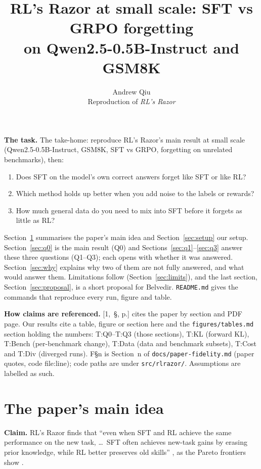 \documentclass[11pt]{article}
\title{RL's Razor at small scale: SFT vs GRPO forgetting\\on Qwen2.5-0.5B-Instruct and GSM8K}
\author{Andrew Qiu\\[4pt]\normalsize Reproduction of \emph{RL's Razor} \cite{razor}}
\date{}
\newcommand{\T}[1]{\textsf{T:#1}}
\newcommand{\F}[1]{\textsf{F\S#1}}
\begin{document}
\maketitle
\thispagestyle{empty}

\noindent\textbf{The task.} The take-home: reproduce RL's Razor's main result at small scale (Qwen2.5-0.5B-Instruct,
GSM8K, SFT vs GRPO, forgetting on unrelated benchmarks), then:
\begin{enumerate}[leftmargin=1.6em,itemsep=0pt]
\item Does SFT on the model's own correct answers forget like SFT or like RL?
\item Which method holds up better when you add noise to the labels or rewards?
\item How much general data do you need to mix into SFT before it forgets as little as RL?
\end{enumerate}
\noindent Section~\ref{sec:idea} summarises the paper's main idea and Section~\ref{sec:setup} our setup.
Section~\ref{sec:q0} is the main result (Q0) and Sections~\ref{sec:q1}--\ref{sec:q3} answer these three questions
(Q1--Q3); each opens with whether it was answered. Section~\ref{sec:why} explains why two of them are not fully
answered, and what would answer them. Limitations follow (Section~\ref{sec:limits}), and the last section,
Section~\ref{sec:proposal}, is a short proposal for Belvedir.
\texttt{README.md} gives the commands that reproduce every run, figure and table.

\medskip
{\small\noindent\textbf{How claims are referenced.} [1,~\S, p.] cites the paper by section and PDF page. Our results
cite a table, figure or section here and the \texttt{figures/tables.md} section holding the numbers: \T{Q0}--\T{Q3}
(those sections), \T{KL} (forward KL), \T{Bench} (per-benchmark change), \T{Data} (data and benchmark subsets),
\T{Cost} and \T{Div} (diverged runs). \F{n} is Section~n of \texttt{docs/paper-fidelity.md} (paper quotes, code
file:line); code paths are under \texttt{src/rlrazor/}. Assumptions are labelled as such.\par}

\medskip
\tableofcontents
\newpage

\section{The paper's main idea}
\label{sec:idea}
\textbf{Claim.} RL's Razor finds that ``even when SFT and RL achieve the same performance on the new task, \ldots\
SFT often achieves new-task gains by erasing prior knowledge, while RL better preserves old skills''
\cite[\S1, p.~2]{razor}, as the Pareto frontiers show \cite[\S3.1, pp.~4--5]{razor}.
\end{document}
